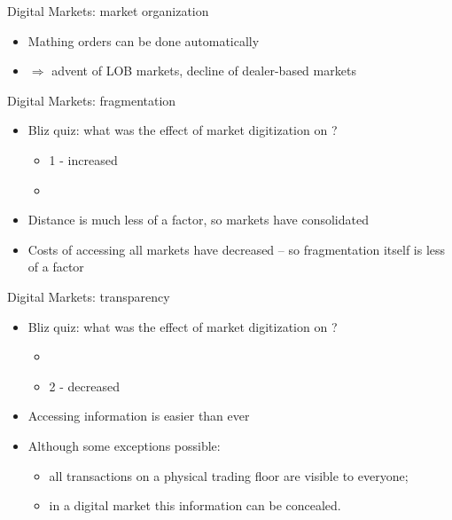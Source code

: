 \documentclass[english,10pt
,aspectratio=169
]{beamer}
\begin{document}
\begin{frame}{Digital Markets: market organization}
	\begin{itemize}
		\item Mathing orders can be done automatically
		\item $\Rightarrow$ advent of LOB markets, decline of dealer-based markets
	\end{itemize}
\end{frame}


\begin{frame}{Digital Markets: fragmentation}
	\begin{itemize}
		\item \alert{Bliz quiz}: what was the effect of market digitization on ?
		\begin{itemize}
			\item {1 - increased}
			\item {}
		\end{itemize}
		\pause
		\item Distance is much less of a factor, so markets have consolidated
		\item Costs of accessing all markets have decreased -- so fragmentation itself is less of a factor
	\end{itemize}
\end{frame}


\begin{frame}{Digital Markets: transparency}
	\begin{itemize}
		\item \alert{Bliz quiz}: what was the effect of market digitization on ?
		\begin{itemize}
			\item {}
			\item {2 - decreased}
		\end{itemize}
		\pause
		\item Accessing information is easier than ever
		\item Although some exceptions possible:
		\begin{itemize}
			\item all transactions on a physical trading floor are visible to everyone;
			\item in a digital market this information can be concealed.
		\end{itemize}
	\end{itemize}
\end{frame}
\end{document}
